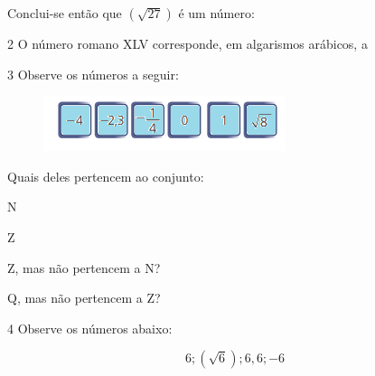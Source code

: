 Conclui-se então que $(\sqrt{27})$ é um número:



\num{2} O número romano XLV corresponde, em algarismos arábicos, a


\num{3} Observe os números a seguir:

\begin{figure}[H]
\centering\includegraphics[width=2.79167in,height=0.63542in]{./imgSAEB_8_MAT/media/image1.png}
\end{figure}

Quais deles pertencem ao conjunto:


\begin{escolha}
\item N 
\item Z 
\item Z, mas não pertencem a N? 
\item Q, mas não pertencem a Z? 
\end{escolha}
\num{4} Observe os números abaixo:

$$6; (\sqrt{6}); 6,6; -6$$

